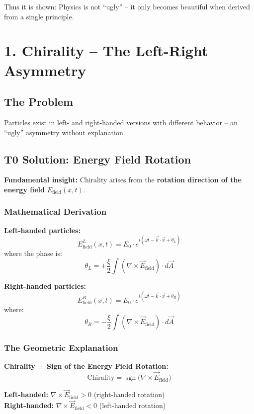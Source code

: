 		Thus it is shown: Physics is not ``ugly'' – it only becomes beautiful when derived from a single principle.

	
	
	\section*{1. Chirality – The Left-Right Asymmetry}
	
	\subsection*{The Problem}
	Particles exist in left- and right-handed versions with different behavior – an ``ugly'' asymmetry without explanation.
	
	\subsection*{T0 Solution: Energy Field Rotation}
	
	\textbf{Fundamental insight:} Chirality arises from the \textbf{rotation direction of the energy field} $E_{\text{field}}(x,t)$.
	
	\subsubsection*{Mathematical Derivation}
	
	\textbf{Left-handed particles:}
	\[
	E_{\text{field}}^L(x,t) = E_0 \cdot e^{i(\omega t - \vec{k} \cdot \vec{x} + \theta_L)}
	\]
	where the phase is:
	\[
	\theta_L = +\frac{\xi}{2} \int (\nabla \times \vec{E}_{\text{field}}) \cdot d\vec{A}
	\]
	
	\textbf{Right-handed particles:}
	\[
	E_{\text{field}}^R(x,t) = E_0 \cdot e^{i(\omega t - \vec{k} \cdot \vec{x} + \theta_R)}
	\]
	where:
	\[
	\theta_R = -\frac{\xi}{2} \int (\nabla \times \vec{E}_{\text{field}}) \cdot d\vec{A}
	\]
	
	\subsubsection*{The Geometric Explanation}
	
	\textbf{Chirality = Sign of the Energy Field Rotation:}
	\[
	\boxed{\text{Chirality} = \operatorname{sgn}\bigl(\nabla \times \vec{E}_{\text{field}}\bigr)}
	\]
	
	\textbf{Left-handed:} $\nabla \times \vec{E}_{\text{field}} > 0$ (right-handed rotation) \\
	\textbf{Right-handed:} $\nabla \times \vec{E}_{\text{field}} < 0$ (left-handed rotation)
	
